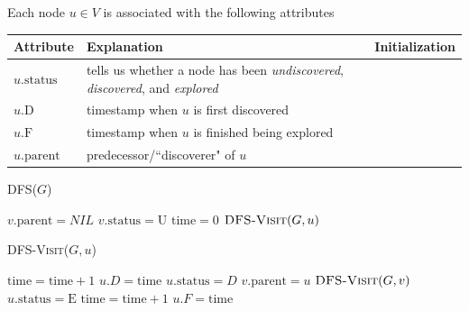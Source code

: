 \documentclass[11  pt]{exam}
\begin{document}
	Each node $u \in V$ is associated with the following attributes
	
	\begin{tabular}{| l | p{8cm} | p{6cm} |}
		\hline
		Attribute & Explanation &Initialization \\
		\hline
		$u.\text{status}$ & tells us whether a node has been \emph{undiscovered}, \emph{discovered}, and \emph{explored} &  \\
		\hline
		$u.\text{D}$ & timestamp when $u$ is first discovered \phantom{the aa} \phantom{quick brown fox jumps over the lazy dog}
		\phantom{for more writing later on in the dell you know} &  \\
		\hline
		$u.\text{F}$ & timestamp when $u$ is finished being explored \phantom{the aa} \phantom{quick brown fox jumps over the lazy dog}
		\phantom{for more writing later on in the dell you know}  &  \\
		\hline
		$u.\text{parent}$ & predecessor/``discoverer" of $u$ \phantom{s a a a a a  here} \phantom{for more writing later on in the dell you know}& \\
		\hline
	\end{tabular}
	\newpage 
	
	
	\begin{minipage}[t]{0.45\textwidth}
		\textsc{DFS}($G$)
		\begin{algorithmic}
			\State $v.\text{parent} = NIL$
			\State $v.\text{status} = \text{U}$
			\EndFor
			\State $\text{time} = 0$
			\State $\textsc{DFS-Visit}(G,u)$
			\EndIf
			\EndFor
		\end{algorithmic}
	\end{minipage}
	\begin{minipage}[t]{0.45\textwidth}
		\textsc{DFS-Visit}($G,u$)
		\begin{algorithmic}
			\State $\text{time} = \text{time} + 1$
			\State $u.D = \text{time}$
			\State $u.\text{status} = D$
			\For{$v \in \text{Adj}[u]$}
			\If{$v.\text{status} == U$}
			\State $v.\text{parent} = u$
			\State $\textsc{DFS-Visit}(G,v)$
			\EndIf
			\EndFor
			\State $u.\text{status} = \text{E}$
			\State $\text{time} = \text{time} + 1$
			\State $u.F = \text{time}$
		\end{algorithmic}
	\end{minipage}
	\vspace{1cm}
	
\end{document}
